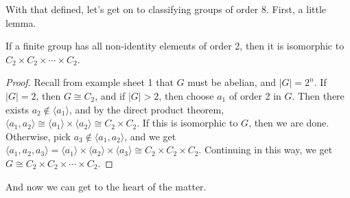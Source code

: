 With that defined, let's get on to classifying groups of order 8.
First, a little lemma.

\begin{lemma}
	If a finite group has all non-identity elements of order 2, then it is isomorphic to $C_2 \times C_2 \times \cdots \times C_2$.
\end{lemma}
\begin{proof}
	Recall from example sheet 1 that $G$ must be abelian, and $|G| = 2^n$. If $|G| = 2$, then $G \cong C_2$, and if $|G| > 2$, then choose $a_1$ of order 2 in $G$. Then there exists $a_2 \not \in \langle a_1 \rangle$, and by the direct product theorem, $\langle a_1, a_2 \rangle \cong \langle a_1 \rangle \times \langle a_2 \rangle \cong C_2 \times C_2$.
	If this is isomorphic to $G$, then we are done. Otherwise, pick $a_3 \not \in \langle a_1, a_2 \rangle$, and we get $\langle a_1, a_2, a_3 \rangle = \langle a_1 \rangle \times \langle a_2 \rangle \times \langle a_3 \rangle \cong C_2 \times C_2 \times C_2$. Continuing in this way, we get $G \cong C_2 \times C_2 \times \cdots \times C_2$. 
\end{proof}

And now we can get to the heart of the matter.

